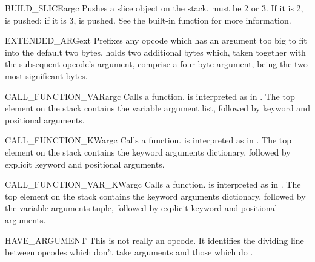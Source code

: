\begin{opcodedesc}{BUILD_SLICE}{argc}
Pushes a slice object on the stack.   must be 2 or 3.  If it
is 2,  is pushed; if it is 3,
 is pushed.
See the  built-in function for more
information.
\end{opcodedesc}

\begin{opcodedesc}{EXTENDED_ARG}{ext}
Prefixes any opcode which has an argument too big to fit into the
default two bytes.   holds two additional bytes which, taken
together with the subsequent opcode's argument, comprise a four-byte
argument,  being the two most-significant bytes.
\end{opcodedesc}

\begin{opcodedesc}{CALL_FUNCTION_VAR}{argc}
Calls a function.  is interpreted as in .
The top element on the stack contains the variable argument list, followed
by keyword and positional arguments.
\end{opcodedesc}

\begin{opcodedesc}{CALL_FUNCTION_KW}{argc}
Calls a function.  is interpreted as in .
The top element on the stack contains the keyword arguments dictionary, 
followed by explicit keyword and positional arguments.
\end{opcodedesc}

\begin{opcodedesc}{CALL_FUNCTION_VAR_KW}{argc}
Calls a function.  is interpreted as in
.  The top element on the stack contains the
keyword arguments dictionary, followed by the variable-arguments
tuple, followed by explicit keyword and positional arguments.
\end{opcodedesc}

\begin{opcodedesc}{HAVE_ARGUMENT}{}
This is not really an opcode.  It identifies the dividing line between
opcodes which don't take arguments  and those which do
.
\end{opcodedesc}

